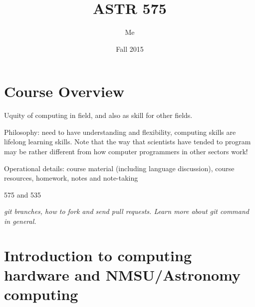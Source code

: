 \documentclass{article}
\title{ASTR 575}
\author{Me}
\date{Fall 2015}
\renewcommand{\descriptionlabel}[1]{%
    \ttfamily\textcolor{myGreen}{#1}}
\newcommand{\test}[1]{%
    \begin{center}
        \colorbox{hl}{\parbox{0.9\textwidth}{\emph{\centering #1}}}
    \end{center}}
\begin{document}
\maketitle
{}
\tableofcontents



\section{Course Overview}
Uquity of computing in field, and also as skill for other fields.

Philosophy: need to have understanding and flexibility, computing
skills are lifelong learning skills. Note that the way that scientists
have tended to program may be rather different from how computer
programmers in other sectors work!

Operational details: course material (including language discussion),
course resources, homework, notes and note-taking

575 and 535

\test{git branches, how to fork and send pull requests. Learn more
about git command in general.}


\section{Introduction to computing hardware and NMSU/Astronomy computing}
\end{document}
